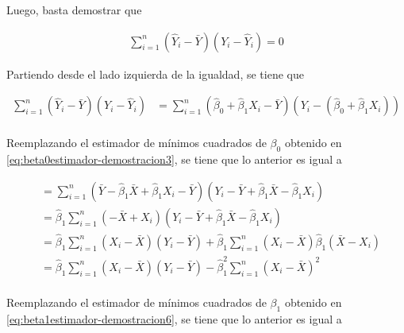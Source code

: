 \documentclass[
  11pt,
]{book}
\theoremstyle{definition}
\theoremstyle{definition}
\theoremstyle{definition}
\theoremstyle{definition}
\theoremstyle{remark}
\begin{document}
Luego, basta demostrar que

\begin{equation}
\begin{split}
\sum_{i=1}^n\left( \widehat{Y}_i - \bar{Y} \right)\left( Y_i - \widehat{Y}_i \right) = 0
\end{split}
\label{eq:demostracionSCT2}
\end{equation}

Partiendo desde el lado izquierda de la igualdad, se tiene que

\begin{equation}
\begin{split}
\sum_{i=1}^n\left( \widehat{Y}_i - \bar{Y} \right)\left( Y_i - \widehat{Y}_i \right) &= \sum_{i=1}^n\left( \widehat{\beta}_0 + \widehat{\beta}_1X_i - \bar{Y} \right)\left( Y_i - \left( \widehat{\beta}_0 + \widehat{\beta}_1X_i \right) \right)\\
\end{split}
\label{eq:demostracionSCT3}
\end{equation}

Reemplazando el estimador de mínimos cuadrados de \(\beta_0\) obtenido en \eqref{eq:beta0estimador-demostracion3}, se tiene que lo anterior es igual a

\begin{equation}
\begin{split}
&= \sum_{i=1}^n\left( \bar{Y} - \widehat{\beta}_1\bar{X} + \widehat{\beta}_1X_i - \bar{Y} \right)\left( Y_i - \bar{Y} + \widehat{\beta}_1\bar{X} - \widehat{\beta}_1X_i \right)\\
&= \widehat{\beta}_1\sum_{i=1}^n\left(-\bar{X}  + X_i \right) \left( Y_i - \bar{Y} + \widehat{\beta}_1\bar{X} - \widehat{\beta}_1X_i \right) \\
&= \widehat{\beta}_1\sum_{i=1}^n\left(X_i -\bar{X} \right) \left( Y_i - \bar{Y}\right) + \widehat{\beta}_1\sum_{i=1}^n\left(X_i -\bar{X} \right)\widehat{\beta}_1 \left( \bar{X} - X_i \right) \\
&= \widehat{\beta}_1\sum_{i=1}^n\left(X_i -\bar{X} \right) \left( Y_i - \bar{Y}\right) - \widehat{\beta}_1^2\sum_{i=1}^n\left(X_i -\bar{X} \right)^2 \\
\end{split}
\label{eq:demostracionSCT4}
\end{equation}

Reemplazando el estimador de mínimos cuadrados de \(\beta_1\) obtenido en \eqref{eq:beta1estimador-demostracion6}, se tiene que lo anterior es igual a
\end{document}
